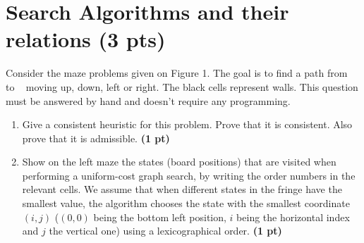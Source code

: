 \documentclass[11pt,a4paper]{report}
\begin{document}
\maketitle

\section{Search Algorithms and their relations (3 pts)}
Consider the maze problems given on Figure 1. The goal is to find a path from \Gentsroom ~ to \EURhv ~ moving up, down, left or right. The black cells represent walls. This question must be answered by hand and doesn't require any programming.

\begin{enumerate}
\item Give a consistent heuristic for this problem. Prove that it is consistent. Also prove that it is admissible. \textbf{(1 pt)}
\end{enumerate}

\begin{answers}[4cm]
\end{answers}



\begin{enumerate}
\setcounter{enumi}{1}
\item Show on the left maze the states (board positions) that
are visited when performing a uniform-cost graph search, by writing the order numbers in the relevant cells. We assume that when different states in the fringe have the smallest value, the algorithm chooses the state with the smallest coordinate $(i,j)$ ($(0,0)$ being the bottom left position, $i$ being the horizontal index and $j$ the vertical one) using a lexicographical order. \textbf{(1 pt)}
\end{enumerate}

\begin{answers}[5.2cm]
\begin{center}
\end{center}
\end{answers}
\end{document}
